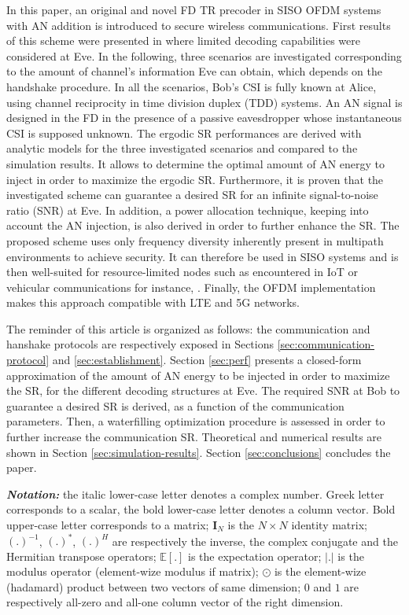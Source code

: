 \documentclass[journal,comsoc]{IEEEtran}
\newcommand{\module}[1]{\left|#1\right|}
\newcommand{\EX}[1]{\mathbb{E} \left[#1\right]}%
\newcommand{\vect}[1]{\boldsymbol{\mathrm{#1}}}
\begin{document}
In this paper, an original and novel FD TR precoder in SISO OFDM systems with AN addition is introduced to secure wireless communications. First results of this scheme were presented in \cite{9049811} where limited decoding capabilities were considered at Eve. In the following, three scenarios are investigated corresponding to the amount of channel's information Eve can obtain, which depends on the handshake procedure.  In all the scenarios, Bob's CSI is fully known at Alice, using channel reciprocity in time division duplex (TDD) systems. An AN signal is designed in the FD in the presence of a passive eavesdropper whose instantaneous CSI is supposed unknown. The ergodic SR performances are derived with analytic models for the three investigated scenarios and compared to the simulation results. It allows to determine the optimal amount of AN energy to inject in order to maximize the ergodic SR. Furthermore, it is proven that the investigated scheme can guarantee a desired SR for an infinite signal-to-noise ratio (SNR) at Eve. In addition, a power allocation technique, keeping into account the AN injection, is also derived in order to further enhance the SR. The proposed scheme uses only frequency diversity inherently present in multipath environments to achieve security. It can therefore be used in SISO systems and is then well-suited for resource-limited nodes such as encountered in IoT or vehicular communications for instance, \cite{9049811}. Finally, the OFDM implementation makes this approach compatible with LTE and 5G networks.

The reminder of this article is organized as follows: the communication and hanshake protocols are respectively exposed in Sections \ref{sec:communication-protocol} and \ref{sec:establishment}. Section \ref{sec:perf} presents a closed-form approximation of the amount of AN energy to be injected in order to maximize the SR, for the different decoding structures at Eve. The required SNR at Bob to guarantee a desired SR is derived, as a function of the communication parameters. Then, a waterfilling optimization procedure is assessed in order to further increase the communication SR. Theoretical and numerical results are shown in Section \ref{sec:simulation-results}. Section \ref{sec:conclusions} concludes the paper.

\textit{\textbf{Notation:}} the italic lower-case letter denotes a complex number. Greek letter corresponds to a scalar, the bold lower-case letter denotes a column vector. Bold upper-case letter corresponds to a matrix; $\textbf{I}_N$ is the $N \times N$ identity matrix; $(.)^{-1}$, $(.)^{*}$, $(.)^{H}$ are respectively the inverse, the complex conjugate and the Hermitian transpose operators; $\EX{.}$ is the expectation operator; $\module{.}$ is the modulus operator (element-wize modulus if matrix); $\odot$ is the element-wize (hadamard) product between two vectors of same dimension; $\vect{0}$ and $\vect{1}$ are respectively all-zero and all-one column vector of the right dimension.
\end{document}
